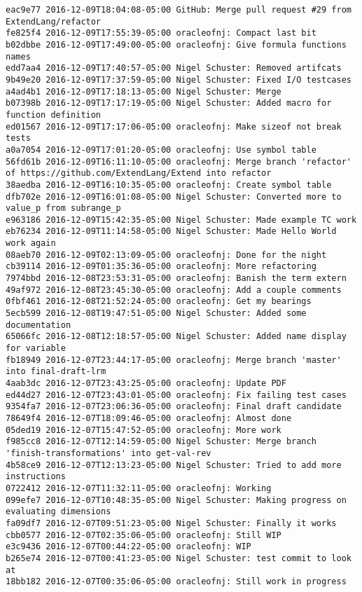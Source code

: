 \begin{lstlisting}
eac9e77 2016-12-09T18:04:08-05:00 GitHub: Merge pull request #29 from ExtendLang/refactor
fe825f4 2016-12-09T17:55:39-05:00 oracleofnj: Compact last bit
b02dbbe 2016-12-09T17:49:00-05:00 oracleofnj: Give formula functions names
edd7aa4 2016-12-09T17:40:57-05:00 Nigel Schuster: Removed artifcats
9b49e20 2016-12-09T17:37:59-05:00 Nigel Schuster: Fixed I/O testcases
a4ad4b1 2016-12-09T17:18:13-05:00 Nigel Schuster: Merge
b07398b 2016-12-09T17:17:19-05:00 Nigel Schuster: Added macro for function definition
ed01567 2016-12-09T17:17:06-05:00 oracleofnj: Make sizeof not break tests
a0a7054 2016-12-09T17:01:20-05:00 oracleofnj: Use symbol table
56fd61b 2016-12-09T16:11:10-05:00 oracleofnj: Merge branch 'refactor' of https://github.com/ExtendLang/Extend into refactor
38aedba 2016-12-09T16:10:35-05:00 oracleofnj: Create symbol table
dfb702e 2016-12-09T16:01:08-05:00 Nigel Schuster: Converted more to value_p from subrange_p
e963186 2016-12-09T15:42:35-05:00 Nigel Schuster: Made example TC work
eb76234 2016-12-09T11:14:58-05:00 Nigel Schuster: Made Hello World work again
08aeb70 2016-12-09T02:13:09-05:00 oracleofnj: Done for the night
cb39114 2016-12-09T01:35:36-05:00 oracleofnj: More refactoring
7974bbd 2016-12-08T23:53:31-05:00 oracleofnj: Banish the term extern
49af972 2016-12-08T23:45:30-05:00 oracleofnj: Add a couple comments
0fbf461 2016-12-08T21:52:24-05:00 oracleofnj: Get my bearings
5ecb599 2016-12-08T19:47:51-05:00 Nigel Schuster: Added some documentation
65066fc 2016-12-08T12:18:57-05:00 Nigel Schuster: Added name display for variable
fb18949 2016-12-07T23:44:17-05:00 oracleofnj: Merge branch 'master' into final-draft-lrm
4aab3dc 2016-12-07T23:43:25-05:00 oracleofnj: Update PDF
ed44d27 2016-12-07T23:43:01-05:00 oracleofnj: Fix failing test cases
9354fa7 2016-12-07T23:06:36-05:00 oracleofnj: Final draft candidate
78649f4 2016-12-07T18:09:46-05:00 oracleofnj: Almost done
05ded19 2016-12-07T15:47:52-05:00 oracleofnj: More work
f985cc8 2016-12-07T12:14:59-05:00 Nigel Schuster: Merge branch 'finish-transformations' into get-val-rev
4b58ce9 2016-12-07T12:13:23-05:00 Nigel Schuster: Tried to add more instructions
0722412 2016-12-07T11:32:11-05:00 oracleofnj: Working
099efe7 2016-12-07T10:48:35-05:00 Nigel Schuster: Making progress on evaluating dimensions
fa09df7 2016-12-07T09:51:23-05:00 Nigel Schuster: Finally it works
cbb0577 2016-12-07T02:35:06-05:00 oracleofnj: Still WIP
e3c9436 2016-12-07T00:44:22-05:00 oracleofnj: WIP
b265e74 2016-12-07T00:41:23-05:00 Nigel Schuster: test commit to look at
18bb182 2016-12-07T00:35:06-05:00 oracleofnj: Still work in progress

\end{lstlisting}
